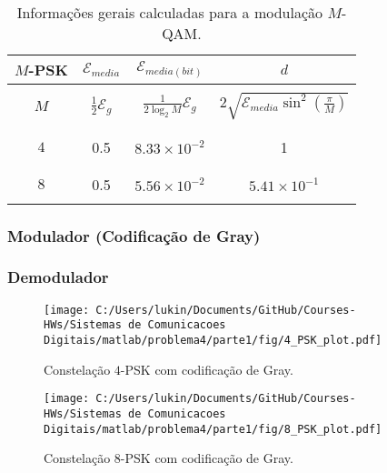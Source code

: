 \begin{table}[!ht]
    \centering
    \begin{tabular}{|c|c|c|c|}
    \hline
    $M$-PSK & $\mathcal{E}_{media}$ & $\mathcal{E}_{media(bit)}$ & $d$ \\ \hline
    & &  &  \\ 
    $M$ & $\frac{1}{2} \mathcal{E}_g$ & $ \frac{1}{2\log_2 M} \mathcal{E}_g$ & $2\sqrt{\mathcal{E}_{media} \sin^2\left(\frac{\pi}{M}\right) } $ \\ 
    & &  &  \\ \hline
    & &  &  \\ 
    $4$     & 0.5 & $ 8.33\times 10^{-2}$ & 1 \\ 
    & &  &  \\ \hline
    & &  &  \\ 
    $8$    & 0.5 & $5.56\times 10^{-2}$ & $5.41\times 10^{-1}$ \\ 
    & &  &  \\ \hline
    \end{tabular}
    \caption{Informações gerais calculadas para a modulação $M$-QAM.}
    \label{tab:Resume_QAM}
\end{table}

\clearpage

\subsubsection*{Modulador (Codificação de Gray)}

\subsubsection*{Demodulador}



\begin{figure}[!ht]
    \centering
    \texttt{[image: C:/Users/lukin/Documents/GitHub/Courses-HWs/Sistemas de Comunicacoes Digitais/matlab/problema4/parte1/fig/4\_PSK\_plot.pdf]}
    \caption{Constelação $4$-PSK com codificação de Gray.}
    \label{fig:4_PSK_plot}
\end{figure}

\begin{figure}[!ht]
    \centering
    \texttt{[image: C:/Users/lukin/Documents/GitHub/Courses-HWs/Sistemas de Comunicacoes Digitais/matlab/problema4/parte1/fig/8\_PSK\_plot.pdf]}
    \caption{Constelação $8$-PSK com codificação de Gray.}
    \label{fig:8_PSK_plot}
\end{figure}



